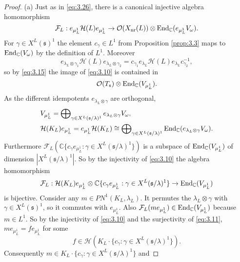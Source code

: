 \documentclass[11pt]{amsart}
\theoremstyle{definition}
\begin{document}
\begin{proof}
(a) Just as in \eqref{eq:3.26}, there is a canonical injective algebra homomorphism
\begin{equation}\label{eq:3.10}
\mathcal F_L : e_{\mu_L^1} {{\mathcal H}} (L) e_{\mu_L^1} \to 
\mathcal O (X_{{\rm nr}}(L)) \otimes {{\rm End}}_{\mathbb C} (e_{\mu_L^1} V_\omega) .
\end{equation}
For $\gamma \in X^L ({{\mathfrak s}})^1$ the element $c_\gamma \in L^1$ from Proposition 
\ref{prop:3.3} maps to ${{\rm End}}_{\mathbb C} (V_\omega)$ by the definition of $L^1$. Moreover
\[
e_{\lambda_L \otimes \gamma_1} {{\mathcal H}} (L) e_{\lambda_L \otimes \gamma_2} =
c_{\gamma_1} e_{\lambda_L} {{\mathcal H}} (L) e_{\lambda_L} c_{\gamma_2}^{-1} ,
\]
so by \eqref{eq:3.15} the image of \eqref{eq:3.10} is contained in
\[
\mathcal O (T_{{\mathfrak s}}) \otimes {{\rm End}}_{\mathbb C} (V_{\mu_L^1}) .
\]
As the different idempotents $e_{\lambda_L \otimes \gamma}$ are orthogonal, 
\begin{align*}
& V_{\mu_L^1} = \bigoplus\nolimits_{\gamma \in X^L ({{\mathfrak s}} / \lambda)^1} 
e_{\lambda_L \otimes \gamma} V_\omega ,\\
& {{\mathcal H}} (K_L) e_{\mu_L^1} = e_{\mu_L^1} {{\mathcal H}} (K_L) \cong
\bigoplus\nolimits_{\gamma \in X^L ({{\mathfrak s}} / \lambda)^1} 
{{\rm End}}_{\mathbb C} (e_{\lambda_L \otimes \gamma} V_\omega) .
\end{align*}
Furthermore $\mathcal F_L ({\mathbb C} \{ c_\gamma e_{\mu_L^1} : 
\gamma \in X^L ({{\mathfrak s}} / \lambda)^1 \})$
is a subspace of ${{\rm End}}_{\mathbb C} (V_{\mu_L^1})$ of dimension $|X^L ({{\mathfrak s}} / \lambda)^1|$.
So by the injectivity of \eqref{eq:3.10} the algebra homomorphism
\begin{equation}\label{eq:3.11}
\mathcal F_L : {{\mathcal H}} (K_L) e_{\mu_L^1} \otimes {\mathbb C} \{ c_\gamma e_{\mu_L^1} : 
\gamma \in X^L ({{\mathfrak s}} / \lambda)^1 \} \to {{\rm End}}_{\mathbb C} (V_{\mu_L^1})
\end{equation}
is bijective. Consider any $m \in PN^1 (K_L,\lambda_L)$. It permutes the 
$\lambda_L \otimes \gamma$ with $\gamma \in X^L ({{\mathfrak s}})^1$, so it commutes with 
$e_{\mu_L^1}$. Also $\mathcal F_L (m e_{\mu_L^1}) \in {{\rm End}}_{\mathbb C} (V_{\mu_L^1})$ 
because $m \in L^1$. So by the injectivity of \eqref{eq:3.10} and the 
surjectivity of \eqref{eq:3.11}, $m e_{\mu_L^1} = f e_{\mu_L^1}$ for some 
\[
f \in {{\mathcal H}} (K_L \cdot \{ c_\gamma : \gamma \in X^L ({{\mathfrak s}} / \lambda)^1 \}) .
\]
Consequently $m \in K_L \cdot \{ c_\gamma : \gamma \in X^L ({{\mathfrak s}} / \lambda)^1 \}$ and

\end{proof}
\end{document}
